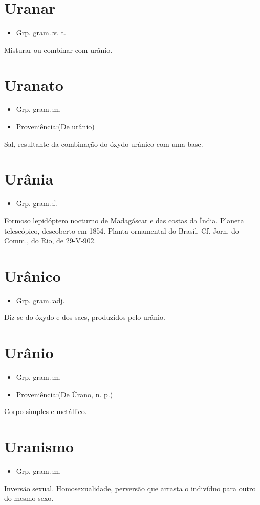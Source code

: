 \documentclass{article}
\begin{document}
\section{Uranar}
\begin{itemize}
\item {Grp. gram.:v. t.}
\end{itemize}
Misturar ou combinar com urânio.
\section{Uranato}
\begin{itemize}
\item {Grp. gram.:m.}
\end{itemize}
\begin{itemize}
\item {Proveniência:(De \textunderscore urânio\textunderscore )}
\end{itemize}
Sal, resultante da combinação do óxydo urânico com uma base.
\section{Urânia}
\begin{itemize}
\item {Grp. gram.:f.}
\end{itemize}
Formoso lepidóptero nocturno de Madagáscar e das costas da Índia.
Planeta telescópico, descoberto em 1854.
Planta ornamental do Brasil. Cf. \textunderscore Jorn.-do-Comm.\textunderscore , do Rio, de 29-V-902.
\section{Urânico}
\begin{itemize}
\item {Grp. gram.:adj.}
\end{itemize}
Diz-se do óxydo e dos saes, produzidos pelo urânio.
\section{Urânio}
\begin{itemize}
\item {Grp. gram.:m.}
\end{itemize}
\begin{itemize}
\item {Proveniência:(De \textunderscore Úrano\textunderscore , n. p.)}
\end{itemize}
Corpo simples e metállico.
\section{Uranismo}
\begin{itemize}
\item {Grp. gram.:m.}
\end{itemize}
Inversão sexual.
Homosexualidade, perversão que arrasta o indivíduo para outro do mesmo sexo.
\end{document}

